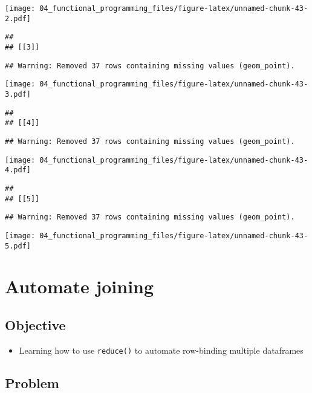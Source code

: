 \documentclass[
]{book}
\providecommand{\tightlist}{%
  \setlength{\itemsep}{0pt}\setlength{\parskip}{0pt}}
\begin{document}
\texttt{[image: 04\_functional\_programming\_files/figure-latex/unnamed-chunk-43-2.pdf]}

\begin{verbatim}
## 
## [[3]]
\end{verbatim}

\begin{verbatim}
## Warning: Removed 37 rows containing missing values (geom_point).
\end{verbatim}

\texttt{[image: 04\_functional\_programming\_files/figure-latex/unnamed-chunk-43-3.pdf]}

\begin{verbatim}
## 
## [[4]]
\end{verbatim}

\begin{verbatim}
## Warning: Removed 37 rows containing missing values (geom_point).
\end{verbatim}

\texttt{[image: 04\_functional\_programming\_files/figure-latex/unnamed-chunk-43-4.pdf]}

\begin{verbatim}
## 
## [[5]]
\end{verbatim}

\begin{verbatim}
## Warning: Removed 37 rows containing missing values (geom_point).
\end{verbatim}

\texttt{[image: 04\_functional\_programming\_files/figure-latex/unnamed-chunk-43-5.pdf]}

\hypertarget{reduce}{%
\section{Automate joining}\label{reduce}}

\hypertarget{objective-1}{%
\subsection{Objective}\label{objective-1}}

\begin{itemize}
\tightlist
\item
  Learning how to use \texttt{reduce()} to automate row-binding multiple dataframes
\end{itemize}

\hypertarget{problem-2}{%
\subsection{Problem}\label{problem-2}}
\end{document}
